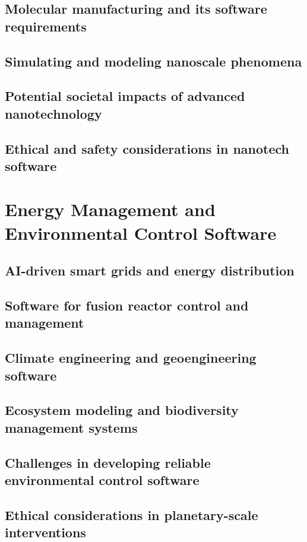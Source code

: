 \subsection{Molecular manufacturing and its software requirements}
\subsection{Simulating and modeling nanoscale phenomena}
\subsection{Potential societal impacts of advanced nanotechnology}
\subsection{Ethical and safety considerations in nanotech software}

\newpage

\section{Energy Management and Environmental Control Software}
\subsection{AI-driven smart grids and energy distribution}
\subsection{Software for fusion reactor control and management}
\subsection{Climate engineering and geoengineering software}
\subsection{Ecosystem modeling and biodiversity management systems}
\subsection{Challenges in developing reliable environmental control software}
\subsection{Ethical considerations in planetary-scale interventions}

